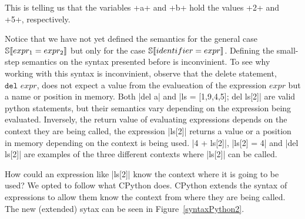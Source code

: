 This is telling us that the variables \pycode+a+ and \pycode+b+ hold the values
\pycode+2+ and \pycode+5+, respectively.

Notice that we have not yet defined the semantics for the general case
$\mathbb{S}\!\left\llbracket expr_1 = expr_2 \right\rrbracket$ but only for the case $\mathbb{S}\!\left\llbracket identifier = expr \right\rrbracket$.
Defining the small-step semantics on the syntax presented before is inconvinient. To see
why working with this syntax is inconvinient, observe that the delete statement,
$\texttt{del } expr$, does not expect a value from the evalueation of the expression
$expr$ but a name or position in memory.  Both \pycode|del a| and \pycode|ls = [1,9,4,5];
del ls[2]| are valid python statements, but their semantics vary depending on the
expression being evaluated. Inversely, the return value of evaluating expressions depends
on the context they are being called, the expression \pycode|ls[2]| returns a value or a
position in memory depending on the context is being used. \pycode|4 + ls[2]|,
\pycode|ls[2] = 4| and \pycode|del ls[2]| are examples of the three different contexts
where \pycode|ls[2]| can be called.

How could an expression like \pycode|ls[2]| know the context where it is going to be used?
We opted to follow what CPython does. CPython extends the syntax of expressions to allow
them know the context from where they are being called. The new (extended) sytax can be
seen in Figure~\ref{syntaxPython2}.


